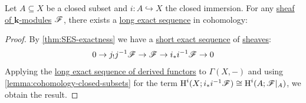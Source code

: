\documentclass[../../main]{subfiles}
\begin{document}
\begin{theorem}[Exactness]\label{thm:exactness-axiom}
  Let \(A \subseteq X\) be a closed subset and \(i\colon A \hookrightarrow X\) the closed immersion.
  For any \hyperref[def:sheaf]{sheaf of \(\mathbf{k}\)-modules} \(\mathscr{F}\), there exists a \hyperref[def:exact-sequence]{long exact sequence} in cohomology:
  \begin{center}
  \end{center}
\end{theorem}
\begin{proof}
  By \autoref{thm:SES-exactness} we have a \hyperref[def:exact-sequence]{short exact sequence} of \hyperref[def:sheaf]{sheaves}:
  \begin{equation*}
    0 \to j_{!}j^{-1}\mathscr{F} \to \mathscr{F} \to i_{\ast}i^{-1}\mathscr{F} \to 0
  \end{equation*}
  Applying the \hyperref[thm:LES-derived-functor]{long exact sequence of derived functors} to \(\Gamma(X, -)\) and using \autoref{lemma:cohomology-closed-subsets} for the term \(\operatorname{H}^{i}(X; i_{\ast}i^{-1}\mathscr{F}) \cong \operatorname{H}^{i}(A; \mathscr{F}|_{A})\), we obtain the result.
\end{proof}
\end{document}
